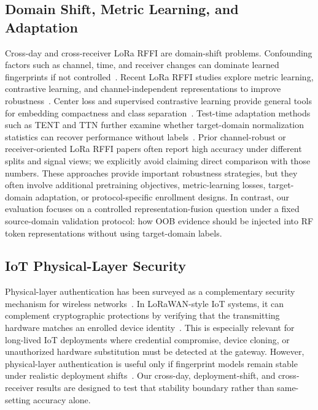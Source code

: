 \subsection{Domain Shift, Metric Learning, and Adaptation}
Cross-day and cross-receiver LoRa RFFI are domain-shift problems.
Confounding factors such as channel, time, and receiver changes can dominate learned fingerprints if not controlled~\cite{cekic2020robust_wireless_fingerprinting,alshawabka2020exposing_fingerprint,shen2022scalable_lora_rffi}.
Recent LoRa RFFI studies explore metric learning, contrastive learning, and channel-independent representations to improve robustness~\cite{shen2022scalable_lora_rffi,ma2025contrastive_lora_rffi,ma2025receiver_independent_rffi}.
Center loss and supervised contrastive learning provide general tools for embedding compactness and class separation~\cite{wen2016center_loss,khosla2020supcon}.
Test-time adaptation methods such as TENT and TTN further examine whether target-domain normalization statistics can recover performance without labels~\cite{wang2021tent,lim2023ttn}.
Prior channel-robust or receiver-oriented LoRa RFFI papers often report high accuracy under different splits and signal views; we explicitly avoid claiming direct comparison with those numbers.
These approaches provide important robustness strategies, but they often involve additional pretraining objectives, metric-learning losses, target-domain adaptation, or protocol-specific enrollment designs.
In contrast, our evaluation focuses on a controlled representation-fusion question under a fixed source-domain validation protocol: how OOB evidence should be injected into RF token representations without using target-domain labels.

\subsection{IoT Physical-Layer Security}
Physical-layer authentication has been surveyed as a complementary security mechanism for wireless networks~\cite{xie2021physical_layer_auth_survey}.
In LoRaWAN-style IoT systems, it can complement cryptographic protections by verifying that the transmitting hardware matches an enrolled device identity~\cite{lorawan_spec,hamdaoui2022deeplearning}.
This is especially relevant for long-lived IoT deployments where credential compromise, device cloning, or unauthorized hardware substitution must be detected at the gateway.
However, physical-layer authentication is useful only if fingerprint models remain stable under realistic deployment shifts~\cite{elmaghbub2021lora_wild}.
Our cross-day, deployment-shift, and cross-receiver results are designed to test that stability boundary rather than same-setting accuracy alone.
